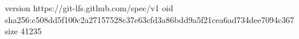 version https://git-lfs.github.com/spec/v1
oid sha256:c508dd5f100c2a27157528c37e63cfd3a86bdd9a5f21cea6ad734dee7094c367
size 41235
